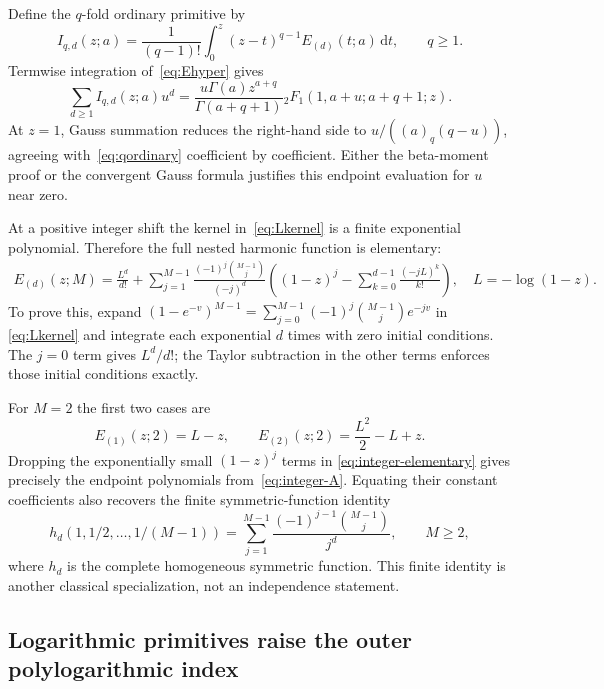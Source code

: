 \documentclass[11pt,oneside]{article}
\numberwithin{equation}{section}
\theoremstyle{definition}
\theoremstyle{remark}
\newcommand{\dd}{\,\mathrm d}
\begin{document}
Define the $q$-fold ordinary primitive by
\[
I_{q,d}(z;a)=\frac1{(q-1)!}\int_0^z(z-t)^{q-1}E_{(d)}(t;a)\dd t,
\qquad q\ge1.
\]
Termwise integration of~\eqref{eq:Ehyper} gives
\begin{equation}\label{eq:ordinary-primitive-generator}
\sum_{d\ge1}I_{q,d}(z;a)u^d
=\frac{u\Gamma(a)z^{a+q}}{\Gamma(a+q+1)}
          {}_2F_1(1,a+u;a+q+1;z).
\end{equation}
At $z=1$, Gauss summation reduces the right-hand side to
$u/((a)_q(q-u))$, agreeing with~\eqref{eq:qordinary} coefficient by
coefficient. Either the beta-moment proof or the convergent Gauss formula
justifies this endpoint evaluation for $u$ near zero.

At a positive integer shift the kernel in~\eqref{eq:Lkernel} is a finite
exponential polynomial. Therefore the full nested harmonic function is
elementary:
\begin{equation}\label{eq:integer-elementary}
\begin{split}
E_{(d)}(z;M)=\frac{L^d}{d!}
+\sum_{j=1}^{M-1}\frac{(-1)^j\binom{M-1}{j}}{(-j)^d}
 \left((1-z)^j-\sum_{k=0}^{d-1}\frac{(-jL)^k}{k!}\right),
\quad L=-\log(1-z).
\end{split}
\end{equation}
To prove this, expand
$(1-e^{-v})^{M-1}=\sum_{j=0}^{M-1}(-1)^j\binom{M-1}{j}e^{-jv}$ in
\eqref{eq:Lkernel} and integrate each exponential $d$ times with zero initial
conditions. The $j=0$ term gives $L^d/d!$; the Taylor subtraction in the
other terms enforces those initial conditions exactly.

For $M=2$ the first two cases are
\[
E_{(1)}(z;2)=L-z,\qquad E_{(2)}(z;2)=\frac{L^2}{2}-L+z.
\]
Dropping the exponentially small $(1-z)^j$ terms in
\eqref{eq:integer-elementary} gives precisely the endpoint polynomials
from~\eqref{eq:integer-A}. Equating their constant coefficients also recovers
the finite symmetric-function identity
\[
h_d(1,1/2,\ldots,1/(M-1))
=\sum_{j=1}^{M-1}\frac{(-1)^{j-1}\binom{M-1}{j}}{j^d},
\qquad M\ge2,
\]
where $h_d$ is the complete homogeneous symmetric function. This finite
identity is another classical specialization, not an independence statement.

\subsection{Logarithmic primitives raise the outer polylogarithmic index}
\end{document}
